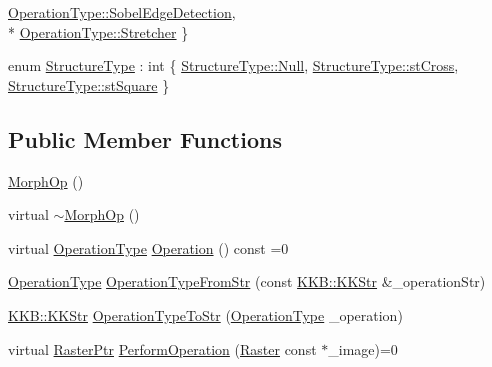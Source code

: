 \begin{DoxyCompactItemize}
\hyperlink{class_k_k_b_1_1_morph_op_a32070d9c14d16849873a8a409f5b0d69ae9eb5dc5ac36ae1b3a4eb7c17def6093}{Operation\+Type\+::\+Sobel\+Edge\+Detection}, 
\\*
\hyperlink{class_k_k_b_1_1_morph_op_a32070d9c14d16849873a8a409f5b0d69a0a93701260be81cae9cf81aade6afaa1}{Operation\+Type\+::\+Stretcher}
 \}
\item 
enum \hyperlink{class_k_k_b_1_1_morph_op_a09e4aff7e81327849855ff72082d85b3}{Structure\+Type} \+: int \{ \hyperlink{class_k_k_b_1_1_morph_op_a09e4aff7e81327849855ff72082d85b3abbb93ef26e3c101ff11cdd21cab08a94}{Structure\+Type\+::\+Null}, 
\hyperlink{class_k_k_b_1_1_morph_op_a09e4aff7e81327849855ff72082d85b3afe6b37e55346afd2a8606e81a7982dc5}{Structure\+Type\+::st\+Cross}, 
\hyperlink{class_k_k_b_1_1_morph_op_a09e4aff7e81327849855ff72082d85b3a04505973fd476144464695ac6483e490}{Structure\+Type\+::st\+Square}
 \}
\end{DoxyCompactItemize}
\subsection*{Public Member Functions}
\begin{DoxyCompactItemize}
\item 
\hyperlink{class_k_k_b_1_1_morph_op_a087902e5cad640c26dfa24804cc2a974}{Morph\+Op} ()
\item 
virtual \hyperlink{class_k_k_b_1_1_morph_op_a489e376d1a5cf2939f52904f111b8c49}{$\sim$\+Morph\+Op} ()
\item 
virtual \hyperlink{class_k_k_b_1_1_morph_op_a32070d9c14d16849873a8a409f5b0d69}{Operation\+Type} \hyperlink{class_k_k_b_1_1_morph_op_abdf6f4bddae0b3cc3dc718559fa60234}{Operation} () const  =0
\item 
\hyperlink{class_k_k_b_1_1_morph_op_a32070d9c14d16849873a8a409f5b0d69}{Operation\+Type} \hyperlink{class_k_k_b_1_1_morph_op_a92d6ed26a570d8f7996b85dfeaeb4856}{Operation\+Type\+From\+Str} (const \hyperlink{class_k_k_b_1_1_k_k_str}{K\+K\+B\+::\+K\+K\+Str} \&\+\_\+operation\+Str)
\item 
\hyperlink{class_k_k_b_1_1_k_k_str}{K\+K\+B\+::\+K\+K\+Str} \hyperlink{class_k_k_b_1_1_morph_op_ae846fc671e95401a7e94912cd4f4ec41}{Operation\+Type\+To\+Str} (\hyperlink{class_k_k_b_1_1_morph_op_a32070d9c14d16849873a8a409f5b0d69}{Operation\+Type} \+\_\+operation)
\item 
virtual \hyperlink{namespace_k_k_b_a80d46bd24db644a022c863bce8ae3633}{Raster\+Ptr} \hyperlink{class_k_k_b_1_1_morph_op_ae7655bec44b6665fd042216e5cb55843}{Perform\+Operation} (\hyperlink{class_k_k_b_1_1_raster}{Raster} const $\ast$\+\_\+image)=0
\end{DoxyCompactItemize}
